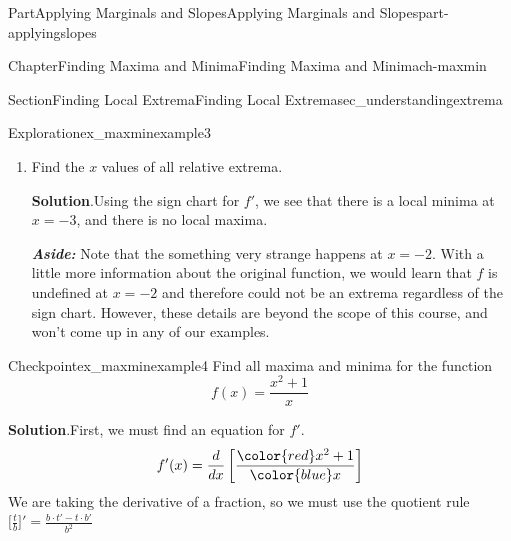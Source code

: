 \documentclass[oneside,10pt,]{tufte-book}
\newcommand{\blocktitlefont}{\relax}
\newcommand{\alert}[1]{\textbf{\textit{#1}}}
\numberwithin{equation}{chapter}
\newcommand{\red}[1]{   {\color{red}   #1}   }
\newcommand{\blue}[1]{  {\color{blue}  #1}  }
\newcommand{\ddxfrac}[1]{ \dfrac{d}{dx} \left[ #1 \right]  }
\newcommand{\D}[1]{ \Big[ #1 \Big]'  }
\begin{document}
\begin{partptx}{Part}{Applying Marginals and Slopes}{}{Applying Marginals and Slopes}{}{}{part-applyingslopes}
\begin{chapterptx}{Chapter}{Finding Maxima and Minima}{}{Finding Maxima and Minima}{}{}{ch-maxmin}
\begin{sectionptx}{Section}{Finding Local Extrema}{}{Finding Local Extrema}{}{}{sec_understandingextrema}
\begin{exploration}{Exploration}{}{ex_maxminexample3}
\begin{enumerate}[font=\bfseries,label=(\alph*),ref=\alph*]
\begin{image}{0}{1}{0}{}
{
}%
\end{image}%
%
\par
Reading off of the sign chart for \(f'\), we see that the \emph{original} (mystery) function \(f\) is increasing on the intervals \((-3,2)\cup(2,\infty)\), and the \emph{original} (mystery) function \(f\) is decreasing on the interval \((-\infty,-3)\).%
\item{}Find the \(x\) values of all relative extrema.%
\par\smallskip%
\noindent\textbf{\blocktitlefont Solution}.\hypertarget{ex_maxminexample3-3-2}{}\quad{}Using the sign chart for \(f'\), we see that there is a local minima at \(x=-3\), and there is no local maxima.%
\par
\alert{Aside:} Note that the something very strange happens at \(x=-2\).  With a little more information about the original function, we would learn that \(f\) is undefined at \(x=-2\) and therefore could not be an extrema regardless of the sign chart.  However, these details are beyond the scope of this course, and won't come up in any of our examples.%
\end{enumerate}%
\end{exploration}%
\begin{inlineexercise}{Checkpoint}{}{ex_maxminexample4}%
Find all maxima and minima for the function%
\begin{equation*}
f(x) = \dfrac{x^2 + 1}{x}
\end{equation*}
%
\par\smallskip%
\noindent\textbf{\blocktitlefont Solution}.\hypertarget{ex_maxminexample4-2}{}\quad{}First, we must find an equation for \(f'\).%
\begin{equation*}
f'(x) = \ddxfrac{\dfrac{ \red{x^2 + 1} }{\blue{x}}} 
\end{equation*}
We are taking the derivative of a fraction, so we must use the quotient rule \(\D{\frac{t}{b}} = \frac{b\cdot t' - t\cdot b'}{b^2}\)%
\begin{align*}

\end{align*}
\end{inlineexercise}
\end{sectionptx}
\end{chapterptx}
\end{partptx}
\end{document}
